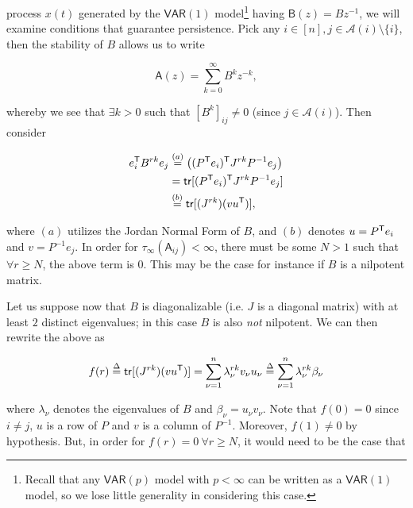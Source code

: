 \documentclass[12pt]{article}
\def\VAR{\mathsf{VAR}}  %
\def\B{\mathsf{B}}  %
\def\A{\mathsf{A}}  %
\newcommand{\anc}[1]{\mathcal{A}(#1)}  %
\begin{document}
\begin{example}
  process $x(t)$ generated by the $\VAR(1)$ model\footnote{Recall that
    any $\VAR(p)$ model with $p < \infty$ can be written as a
    $\VAR(1)$ model, so we lose little generality in considering this
    case.}  having $\B(z) = Bz^{-1}$, we will examine
  conditions that guarantee persistence.  Pick any
  $i \in [n], j \in \anc{i} \setminus \{i\}$, then the stability of
  $B$ allows us to write

  \begin{equation*}
    \A(z) = \sum_{k = 0}^\infty B^k z^{-k},
  \end{equation*}

  whereby we see that $\exists k > 0$ such that $[B^k]_{ij} \ne 0$
  (since $j \in \anc{i}$).  Then consider

  \begin{equation*}
    \begin{aligned}
      e_i^{\mathsf{T}} B^{rk} e_j &\overset{(a)}{=} \big((P^{\mathsf{T}} e_i)^{\mathsf{T}} J^{rk} P^{-1}e_j\big)\\
      &= \mathsf{tr } [(P^{\mathsf{T}} e_i)^{\mathsf{T}} J^{rk} P^{-1}e_j]\\
      &\overset{(b)}{=} \mathsf{tr } [(J^{rk}) (v u^{\mathsf{T}})],
    \end{aligned}
  \end{equation*}

  where $(a)$ utilizes the Jordan Normal Form of $B$, and $(b)$
  denotes $u = P^{\mathsf{T}} e_i$ and $v = P^{-1}e_j$.  In order for
  $\tau_\infty(\A_{ij}) < \infty$, there must be some $N > 1$ such
  that $\forall r \ge N$, the above term is $0$.  This may be the case
  for instance if $B$ is a nilpotent matrix.  

  Let us suppose now that $B$ is diagonalizable (i.e. $J$ is a
  diagonal matrix) with at least $2$ distinct eigenvalues; in this
  case $B$ is also \textit{not} nilpotent.  We can then rewrite the
  above as

  \begin{equation*}
    f(r) \overset{\Delta}{=} \mathsf{tr } [(J^{rk}) (v u^{\mathsf{T}})] = \sum_{\nu = 1}^n \lambda_\nu ^{rk} v_\nu u_\nu \overset{\Delta}{=} \sum_{\nu = 1}^n \lambda_\nu^{rk} \beta_\nu
  \end{equation*}

  where $\lambda_\nu$ denotes the eigenvalues of $B$ and
  $\beta_\nu = u_\nu v_\nu$.  Note that $f(0) = 0$ since $i \ne j$,
  $u$ is a row of $P$ and $v$ is a column of $P^{-1}$.  Moreover,
  $f(1) \ne 0$ by hypothesis.  But, in order for
  $f(r) = 0\ \forall r \ge N$, it would need to be the case that


\end{example}
\end{document}

